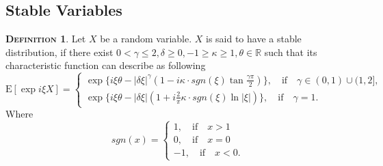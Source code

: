 \documentclass[a4paper, twoside, 11pt]{article}
\theoremstyle{definition}
\newtheorem{definition}{\scshape Definition}[section]
\newtheorem{lemma}[definition]{\scshape Lemma}
\begin{document}
\subsection{Stable Variables}


\begin{definition}
  Let $X$ be a random variable. $X$ is said to have a stable distribution, if there exist $0 < \gamma \le 2, \delta \ge 0, -1 \ge \kappa \ge 1, \theta \in \mathbb{R}$ such that its characteristic function can describe as following
  \begin{equation}
	\mathrm{E} [\exp i\xi X] =  \begin{cases} \exp\{i \xi \theta - |\delta\xi|^\gamma(1-i\kappa\cdot sgn(\xi)\tan \frac{\gamma\pi}{2})\},\hspace{1em}  \text{if}\hspace{1em} \gamma \in (0, 1) \cup (1, 2], \\
	    \exp\{i \xi \theta - |\delta\xi|(1+i\frac{2}{\pi}\kappa\cdot sgn(\xi)\ln |\xi|)\},\hspace{1em} \text{if}\hspace{1em} \gamma = 1.
	  \end{cases}
	\label{sec:stbl}
  \end{equation}
 Where
$$
 sgn(x) = \begin{cases} 1,\hspace{1em} \text{if}\hspace{1em} x > 1\\
   0,\hspace{1em} \text{if}\hspace{1em} x = 0 \\
   -1,\hspace{1em}\text{if}\hspace{1em} x < 0.
 \end{cases}
  $$
\end{definition}
\end{document}
